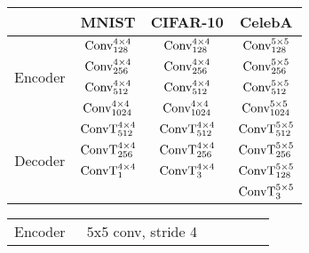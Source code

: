 \begin{figure}[h]
    \begin{minipage}{0.55\textwidth}
    \centering
    {\footnotesize    
    \begin{tabular}{c|c|c|c}
            \toprule
          & MNIST & CIFAR-10 & CelebA\\
          \midrule\midrule
          \multirow{4}{*}{Encoder}
                 & $\textrm{Conv}_{128}^{4\times4}$ & $\textrm{Conv}_{128}^{4\times4}$ & $\textrm{Conv}_{128}^{5\times5}$ \\
                 & $\textrm{Conv}_{256}^{4\times4}$ & $\textrm{Conv}_{256}^{4\times4}$ & $\textrm{Conv}_{256}^{5\times5}$ \\
                 & $\textrm{Conv}_{512}^{4\times4}$ & $\textrm{Conv}_{512}^{4\times4}$ & $\textrm{Conv}_{512}^{5\times5}$ \\
                 & $\textrm{Conv}_{1024}^{4\times4}$ & $\textrm{Conv}_{1024}^{4\times4}$ & $\textrm{Conv}_{1024}^{5\times5}$ \\
                 \midrule
          \multirow{4}{*}{Decoder}
                 & $\textrm{ConvT}_{512}^{4\times4}$ & $\textrm{ConvT}_{512}^{4\times4}$ & $\textrm{ConvT}_{512}^{5\times5}$ \\
                 & $\textrm{ConvT}_{256}^{4\times4}$ & $\textrm{ConvT}_{256}^{4\times4}$ & $\textrm{ConvT}_{256}^{5\times5}$ \\
                 & $\textrm{ConvT}_{1}^{4\times4}$ & $\textrm{ConvT}_{3}^{4\times4}$ & $\textrm{ConvT}_{128}^{5\times5}$ \\
                 &                       &                       & $\textrm{ConvT}_{3}^{5\times5}$ \\
                 \bottomrule
    \end{tabular}
    }
    \label{tab:vision_architecture}
    \end{minipage}
    \hspace{0.02\textwidth}
    \begin{minipage}{0.4\textwidth}
    \centering
    {\footnotesize
    \begin{tabular}{p{0.25\linewidth}>{\centering\arraybackslash}p{0.65\linewidth}}
         \toprule
          \multirow{4}{*}[-0.5em]{Encoder}& 5x5 conv, stride 4 \\\cline{2-2}

\end{tabular}}
\end{minipage}
\end{figure}
